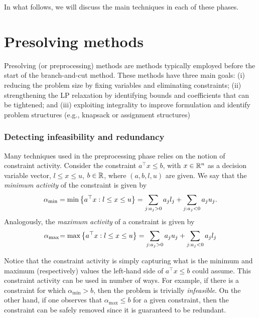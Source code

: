 In what follows, we will discuss the main techniques in each of these phases. 


\section{Presolving methods}

Presolving (or preprocessing) methods are methods typically employed before the start of the branch-and-cut method. These methods have three main goals: (i) reducing the problem size by fixing variables and eliminating constraints; (ii) strengthening the LP relaxation by identifying bounds and coefficients that can be tightened; and (iii) exploiting integrality to improve formulation and identify problem structures (e.g., knapsack or assignment structures)


\subsubsection{Detecting infeasibility and redundancy}

Many techniques used in the preprocessing phase relies on the notion of constraint activity. Consider the constraint $a^\top x \leq b$, with $x \in \mathbb{R}^n$ as a decision variable vector, $l \leq x \leq u$, $b \in \mathbb{R}$, where $(a,b,l,u)$ are given. We say that the \emph{minimum activity} of the constraint is given by
%
\begin{equation*}
	\alpha_{\text{min}} = \min\left\{ a^\top x : l \leq x \leq u \right \} = \sum_{j : a_j > 0}a_jl_j + \sum_{j : a_j < 0}a_j u_j.	
\end{equation*}
%
Analogously, the \emph{maximum activity} of a constraint is given by 
%
\begin{equation*}
	\alpha_{\text{max}} \hspace{-2pt} = \max\left\{ a^\top x : l \leq x \leq u \right \} = \sum_{j : a_j > 0}a_ju_j + \sum_{j : a_j < 0}a_jl_j
\end{equation*}

Notice that the constraint activity is simply capturing what is the minimum and maximum (respectively) values the left-hand side of $a^\top x \leq b$ could assume. This constraint activity can be used in number of ways. For example, if there is a constraint for which $\alpha_{\text{min}} > b$, then the problem is trivially \emph{infeasible}. On the other hand, if one observes that $\alpha_{\text{max}} \leq b$ for a given constraint, then the constraint can be safely removed since it is guaranteed to be redundant.


